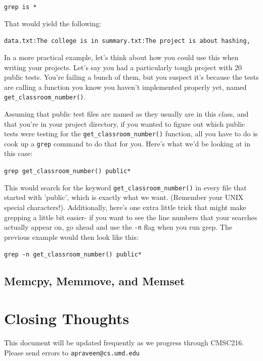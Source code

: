 \documentclass[english, 10pt]{article}
\begin{document}
\texttt{grep is *}\newline

That would yield the following:\newline

\texttt{data.txt:The college is in\newline
summary.txt:The project is about hashing,
}\newline

In a more practical example, let's think about how you could use this when writing your projects. Let's say you had a particularly tough project with 20 public tests. You're failing a bunch of them, but you suspect it's because the tests are calling a function you know you haven't implemented properly yet, named \texttt{get\_classroom\_number()}.\newline

Assuming that public test files are named as they usually are in this class, and that you're in your project directory, if you wanted to figure out which public tests were testing for the \texttt{get\_classroom\_number()} function, all you have to do is cook up a \texttt{grep} command to do that for you. Here's what we'd be looking at in this case:\newline

\texttt{grep get\_classroom\_number() public*}\newline

This would search for the keyword \texttt{get\_classroom\_number()} in every file that started with 'public', which is exactly what we want. (Remember your UNIX special characters!). Additionally, here's one extra little trick that might make grepping a little bit easier- if you want to see the line numbers that your searches actually appear on, go ahead and use the \texttt{-n} flag when you run grep. The previous example would then look like this:\newline

\texttt{grep -n get\_classroom\_number() public*}\newline

\subsection{Memcpy, Memmove, and Memset}


\section{Closing Thoughts}

This document will be updated frequently as we progress through CMSC216. Please send errors to \texttt{apraveen@cs.umd.edu}
\end{document}
